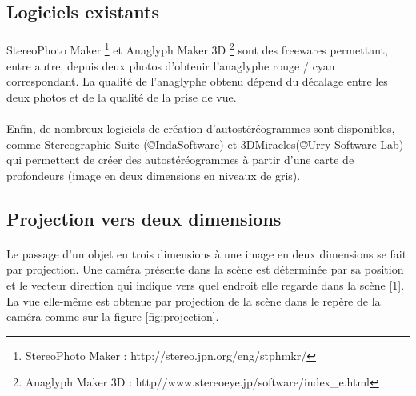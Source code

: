 \subsection{Logiciels existants}

\paragraph{}
	StereoPhoto Maker \footnote{StereoPhoto Maker : http://stereo.jpn.org/eng/stphmkr/} et Anaglyph Maker 3D \footnote{Anaglyph Maker 3D : http//www.stereoeye.jp/software/index\_e.html} sont des freewares permettant, entre autre, depuis deux photos d'obtenir l’anaglyphe rouge / cyan correspondant. La qualité de l'anaglyphe obtenu dépend du décalage entre les deux photos et de la qualité de la prise de vue. 
	
\paragraph{}
	Enfin, de nombreux logiciels de création d'autostéréogrammes sont disponibles, comme Stereographic Suite  (\copyright IndaSoftware) et 3DMiracles(\copyright Urry Software Lab) qui permettent de créer des autostéréogrammes à partir d'une carte de profondeurs (image en deux dimensions en niveaux de gris).
	
\subsection{Projection vers deux dimensions}

\paragraph{}
	Le passage d’un objet en trois dimensions à une image en deux dimensions se fait par projection. Une caméra présente dans la scène est déterminée par sa position et le vecteur direction qui indique vers quel endroit elle regarde dans la scène [1]. La vue elle-même est obtenue par projection de la scène dans le repère de la caméra comme sur la figure  \ref{fig:projection}.
	

